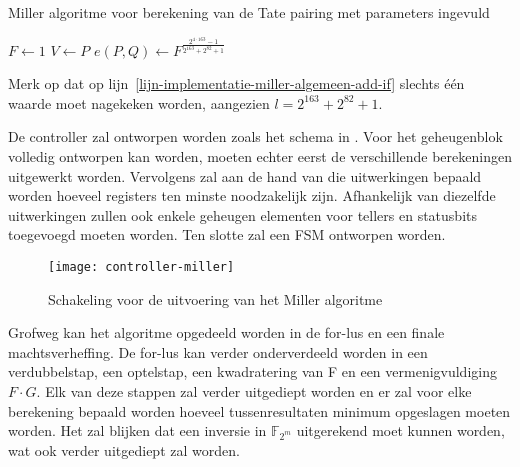 \begin{algorithm}[h]
	\caption{Miller algoritme voor berekening van de Tate pairing met parameters ingevuld}
	\label{algoritme-implementatie-miller-algemeen}
	$F \leftarrow 1$\;
	$V \leftarrow P$\;
	$e(P, Q) \leftarrow F^{\frac{2^{4 \cdot 163} - 1}{2^{163} + 2^{82} + 1}}$\;
\end{algorithm}

Merk op dat op lijn~\ref{lijn-implementatie-miller-algemeen-add-if} slechts \'e\'en waarde moet nagekeken worden, aangezien $l = 2^{163} + 2^{82} + 1$.

De controller zal ontworpen worden zoals het schema in . Voor het geheugenblok volledig ontworpen kan worden, moeten echter eerst de verschillende berekeningen uitgewerkt worden. Vervolgens zal aan de hand van die uitwerkingen bepaald worden hoeveel registers ten minste noodzakelijk zijn. Afhankelijk van diezelfde uitwerkingen zullen ook enkele geheugen elementen voor tellers en statusbits toegevoegd moeten worden. Ten slotte zal een FSM ontworpen worden.

\begin{figure}[h]
	\centering
		\texttt{[image: controller-miller]}
		\caption{Schakeling voor de uitvoering van het Miller algoritme\label{figuur-implementatie-miller-controller}}
\end{figure}

Grofweg kan het algoritme opgedeeld worden in de for-lus  en een finale machtsverheffing. De for-lus kan verder onderverdeeld worden in een verdubbelstap, een optelstap, een kwadratering van F en een vermenigvuldiging $F \cdot G$. Elk van deze stappen zal verder uitgediept worden en er zal voor elke berekening bepaald worden hoeveel tussenresultaten minimum opgeslagen moeten worden. Het zal blijken dat een inversie in $\mathbb{F}_{2^m}$ uitgerekend moet kunnen worden, wat ook verder uitgediept zal worden.

